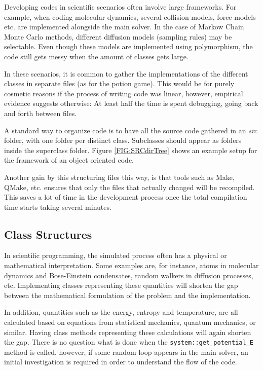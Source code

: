 Developing codes in scientific scenarios often involve large frameworks. For example, when coding molecular dynamics, several collision models, force models etc. are implemented alongside the main solver. In the case of Markow Chain Monte Carlo methods, different diffusion models (sampling rules) may be selectable. Even though these models are implemented using polymorphism, the code still gets messy when the amount of classes  gets large. 

In these scenarios, it is common to gather the implementations of the different classes in separate files (as for the potion game). This would be for purely cosmetic reasons if the process of writing code was linear, however, empirical evidence suggests otherwise: At least half the time is spent debugging, going back and forth between files. 

A standard way to organize code is to have all the source code gathered in an \textit{src} folder, with one folder per distinct class. Subclasses should appear as folders inside the superclass folder. Figure \ref{FIG:SRCdirTree} shows an example setup for the framework of an object oriented code.



Another gain by this structuring files this way, is that tools such as Make, QMake, etc. ensures that only the files that actually changed will be recompiled. This saves a lot of time in the development process once the total compilation time starts taking several minutes.

\subsection{Class Structures}

In scientific programming, the simulated process often has a physical or mathematical interpretation. Some examples are, for instance, atoms in molecular dynamics and Bose-Einstein condensates, random walkers in diffusion processes, etc. Implementing classes representing these quantities will shorten the gap between the mathematical formulation of the problem and the implementation.

In addition, quantities such as the energy, entropy and temperature, are all calculated based on equations from statistical mechanics, quantum mechanics, or similar. Having class methods representing these calculations will again shorten the gap. There is no question what is done when the \verb+system::get_potential_E+ method is called, however, if some random loop appears in the main solver, an initial investigation is required in order to understand the flow of the code.

